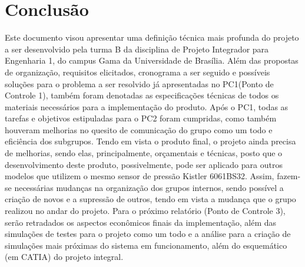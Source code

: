\chapter{Conclusão}
  Este documento visou apresentar uma definição técnica mais profunda do projeto a ser desenvolvido pela turma B da disciplina de Projeto Integrador para Engenharia 1, do campus Gama da Universidade de Brasília. Além das propostas de organização, requisitos elicitados, cronograma a ser seguido e possíveis soluções para o problema a ser resolvido já apresentadas no PC1(Ponto de Controle 1), também foram denotadas as especificações técnicas de todos os materiais necessários para a implementação do produto. Após o PC1, todas as tarefas e objetivos estipuladas para o PC2 foram cumpridas, como também houveram melhorias no quesito de comunicação do grupo como um todo e eficiência dos subgrupos. Tendo em vista o produto final, o projeto ainda precisa de melhorias, sendo elas, principalmente, orçamentais e técnicas, posto que o desenvolvimento deste produto, possivelmente, pode ser aplicado para outros modelos que utilizem o mesmo sensor de pressão Kistler 6061BS32. Assim, fazem-se necessárias mudanças na organização dos grupos internos, sendo possível a criação de novos e a supressão de outros, tendo em vista a mudança que o grupo realizou no andar do projeto. Para o próximo relatório (Ponto de Controle 3), serão retradados os aspectos econômicos finais da implementação, além das simulações de testes para o projeto como um todo e a análise para a criação de simulações mais próximas do sistema em funcionamento, além do esquemático (em CATIA) do projeto integral.   
